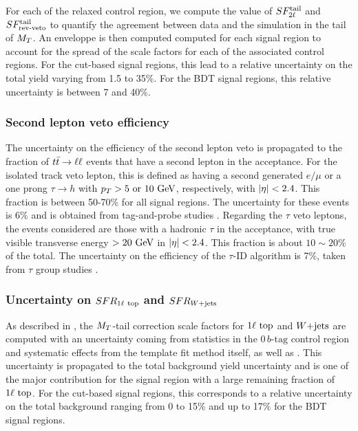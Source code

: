             For each of the relaxed control region, we compute the value of $SF_{2\ell}^{\text{tail}}$
            and $SF_{\text{rev-veto}}^{\text{tail}}$ to quantify the agreement between data and the simulation in
            the tail of $M_T$. An enveloppe is then computed computed for each signal
            region to account for the spread of the scale factors for each of the
            associated control regions. For the cut-based signal regions, this lead to a
            relative uncertainty on the total yield varying from 1.5 to 35\%. For the
            BDT signal regions, this relative uncertainty is between 7 and 40\%.

            \subsubsection{Second lepton veto efficiency}

            The uncertainty on the efficiency of the second lepton veto is propagated to the
            fraction of $t\bar{t} \rightarrow \ell \ell$ events that have a second lepton in the acceptance. For
            the isolated track veto lepton, this is defined as having a second generated
            $e/\mu$ or a one prong $\tau \rightarrow h$ with $p_T > 5 \text{ or } 10 ~\text{GeV}$,
            respectively, with $\left| \eta \right| < 2.4$. This fraction is between 50-70\% for all
            signal regions. The uncertainty for these events is 6\% and is obtained from
            tag-and-probe studies . Regarding the $\tau$ veto leptons, the
            events considered are those with a hadronic $\tau$ in the acceptance, with
            true visible transverse energy $> 20~\text{GeV}$ in $\left| \eta \right| < 2.4$. This fraction is
            about $10 \sim 20 \%$ of the total. The uncertainty on the efficiency of the
            $\tau$-ID algorithm is 7\%, taken from $\tau$ group studies .

            \subsubsection{Uncertainty on $SFR_{1\ell~\text{top}}$ and $SFR_{\text{$W$+jets}}$}

            As described in , the $M_T$-tail correction
            scale factors for $1\ell~\text{top}$ and $\text{$W$+jets}$ are computed with an uncertainty
            coming from statistics in the $0\, b\text{-tag}$ control region and systematic effects
            from the template fit method itself, as well as . This uncertainty is propagated
            to the total background yield uncertainty and is one of the major contribution
            for the signal region with a large remaining fraction of $1\ell~\text{top}$.
            For the cut-based signal regions, this corresponds to a relative uncertainty
            on the total background ranging from 0 to 15\% and up to 17\% for the BDT
            signal regions.

